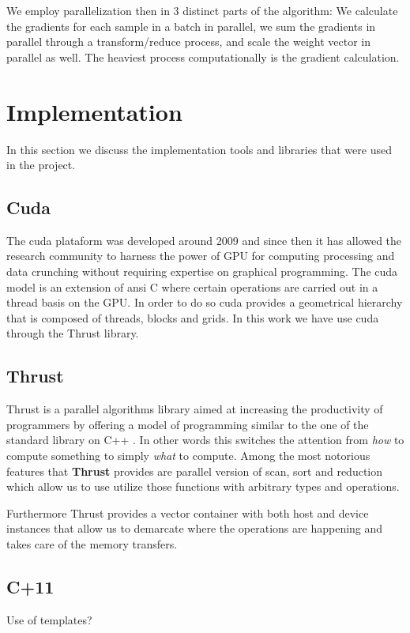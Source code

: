 \documentclass[11pt,a4paper]{article}
\begin{document}
We employ parallelization then in 3 distinct parts of the algorithm: We calculate the gradients for
each sample in a batch in parallel, we sum the gradients in parallel through a transform/reduce
process, and scale the weight vector in parallel as well. The heaviest process computationally is
the gradient calculation.


\section{Implementation}
In this section we discuss the implementation tools and libraries that were used in the project.

\subsection{Cuda}
The cuda plataform was developed around 2009 \citep{nickolls2008scalable} and since then it has
allowed the research community to harness the power of GPU for computing processing and data
crunching without requiring expertise on graphical programming. The cuda model is an extension of
ansi C where certain operations are carried out in a thread basis on the GPU. In order to do so
cuda provides a geometrical hierarchy that is composed of threads, blocks and grids. In this work
we have use cuda through the Thrust library.

\subsection{Thrust}
Thrust is a parallel algorithms library aimed at increasing the productivity of programmers by
offering a model of programming similar to the one of the standard library on C++
\citep{bell2012thrust}. In other words this switches the attention from \textit{how} to compute
something to simply \textit{what} to compute. Among the most notorious features that
\textbf{Thrust} provides are parallel version of scan, sort and reduction which allow us to use
utilize those functions with arbitrary types and operations.

Furthermore Thrust provides a vector container with both host and device instances that allow us to demarcate where the operations are happening and takes care of the memory transfers.


\subsection{C+11}
Use of templates?
\end{document}
